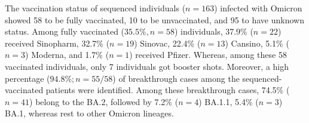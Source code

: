 
The vaccination status of sequenced individuals ($n=163$) infected with Omicron showed 58 to be fully vaccinated, 10 to be unvaccinated, and 95 to have unknown status.
Among fully vaccinated ($35.5\%, n= 58$) individuals, 37.9\% ($n=22$) received Sinopharm, 32.7\% ($n=19$) Sinovac, 22.4\% ($n=13$) Cansino, 5.1\% ($n=3$) Moderna, and 1.7\% ($n=1$) received Pfizer.
Whereas, among these 58 vaccinated individuals, only 7 individuals got booster shots.
Moreover, a high percentage ($94.8\%; n=55/58$) of breakthrough cases among the sequenced-vaccinated patients were identified.
Among these breakthrough cases, 74.5\% ($n=41$) belong to the BA.2, followed by 7.2\% ($n=4$) BA.1.1, 5.4\% ($n=3$) BA.1, whereas rest to other Omicron lineages.


